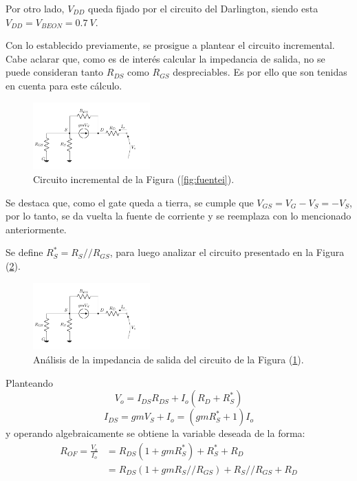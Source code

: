 Por otro lado, $V_{DD}$ queda fijado por el circuito del Darlington, siendo esta $V_{DD} = V_{BEON} = 0.7 \ V$.

Con lo establecido previamente, se prosigue a plantear el circuito incremental. Cabe aclarar que, como es de interés calcular la impedancia de salida, no se puede consideran tanto $R_{DS}$ como $R_{GS}$ despreciables. Es por ello que son tenidas en cuenta para este cálculo.
\begin{figure}[H]
\centering
	\includegraphics[width=0.4\textwidth, page=1]{Imagenes/ModeloIncremental.pdf}
	\caption{Circuito incremental de la Figura (\ref{fig:fuentei}).}
\label{fig:incfuente1}
\end{figure}

Se destaca que, como el gate queda a tierra, se cumple que $V_{GS} = V_G - V_S = - V_S$, por lo tanto, se da vuelta la fuente de corriente y se reemplaza con lo mencionado anteriormente. 

Se define $R_S^* = R_S // R_{GS}$, para luego analizar el circuito presentado en la Figura (\ref{fig:incfuente2}).
\begin{figure}[H]
\centering
\hspace*{2cm}
	\includegraphics[width=0.4\textwidth, page=2]{Imagenes/ModeloIncremental.pdf}
	\caption{Análisis de la impedancia de salida del circuito de la Figura (\ref{fig:incfuente1}).}
\label{fig:incfuente2}
\end{figure}

Planteando
\begin{equation*}
	V_o = I_{DS} R_{DS} + I_o \left( R_D + R_S^* \right)
\end{equation*}
\begin{equation*}
	I_{DS} = gm V_S + I_o = \left( gm R_S^* + 1 \right) I_o
\end{equation*}
y operando algebraicamente se obtiene la variable deseada de la forma:
\begin{equation}
\begin{split}
	R_{OF} = \frac{V_o}{I_o} & = R_{DS} \left( 1 + gm R_S^* \right) + R_S^* + R_D \\
		   & = R_{DS} \left( 1 + gm R_S//R_{GS} \right) + R_S//R_{GS} + R_D
\end{split}
\end{equation}

